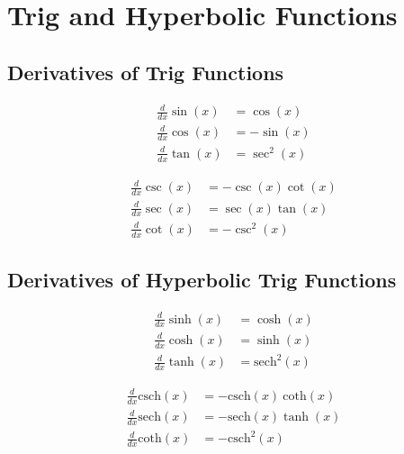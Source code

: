 \documentclass{article}
\begin{document}
\section{Trig and Hyperbolic Functions}
\subsection{Derivatives of Trig Functions}
\vspace{-2em}
\begin{multicols}{2}
    \begin{align}
        \frac{d}{dx} \sin(x) &= \cos(x)\\
        \frac{d}{dx} \cos(x) &= -\sin(x)\\
        \frac{d}{dx} \tan(x) &= \sec^2(x)
    \end{align}

    \begin{align}
        \frac{d}{dx} \csc(x) &= -\csc(x)\cot(x)\\
        \frac{d}{dx} \sec(x) &= \sec(x)\tan(x)\\
        \frac{d}{dx} \cot(x) &= -\csc^2(x)
    \end{align}
\end{multicols}

\subsection{Derivatives of Hyperbolic Trig Functions}
\vspace{-2em}
\begin{multicols}{2}
    \begin{align}
        \frac{d}{dx} \sinh(x) &= \cosh(x)\\
        \frac{d}{dx} \cosh(x) &= \sinh(x)\\
        \frac{d}{dx} \tanh(x) &= \text{sech}^2(x)
    \end{align}

    \begin{align}
        \frac{d}{dx} \text{csch}(x) &= -\text{csch}(x)\ \text{coth}(x)\\
        \frac{d}{dx} \text{sech}(x) &= -\text{sech}(x) \tanh(x)\\
        \frac{d}{dx} \text{coth}(x) &= -\text{csch}^2(x)
    \end{align}
\end{multicols}

\end{document}
